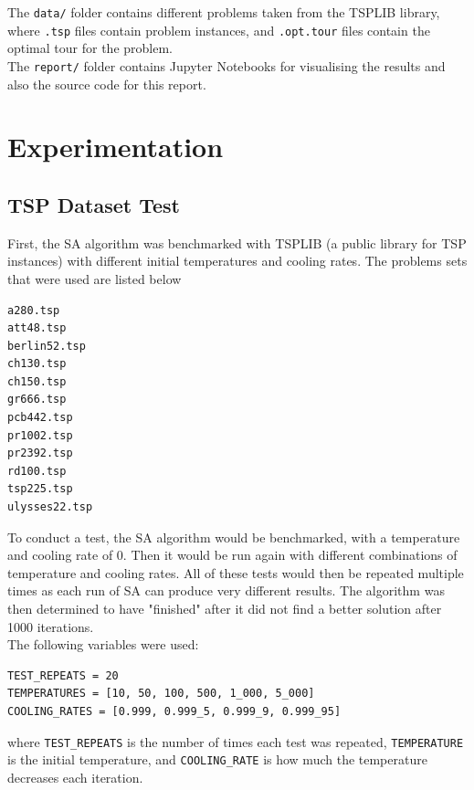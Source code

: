 \documentclass{article}
\begin{document}
The \texttt{data/} folder contains different problems taken from the TSPLIB library, where \texttt{.tsp} files contain problem instances, and \texttt{.opt.tour} files contain the optimal tour for the problem.
\\

The \texttt{report/} folder contains Jupyter Notebooks for visualising the results and also the source code for this report.

\newpage
\section{Experimentation}

\subsection{TSP Dataset Test}
First, the SA algorithm was benchmarked with TSPLIB \cite{tsplib} (a public library for TSP instances) with different initial temperatures and cooling rates.
The problems sets that were used are listed below

\begin{multicols}{6}
\begin{verbatim}
a280.tsp
att48.tsp
berlin52.tsp
ch130.tsp
ch150.tsp
gr666.tsp
pcb442.tsp
pr1002.tsp
pr2392.tsp
rd100.tsp
tsp225.tsp
ulysses22.tsp
\end{verbatim}
\end{multicols}

To conduct a test, the SA algorithm would be benchmarked, with a temperature and cooling rate of 0.
Then it would be run again with different combinations of temperature and cooling rates.
All of these tests would then be repeated multiple times as each run of SA can produce very different results.
The algorithm was then determined to have "finished" after it did not find a better solution after 1000 iterations.
\\

The following variables were used:

\begin{verbatim}
TEST_REPEATS = 20
TEMPERATURES = [10, 50, 100, 500, 1_000, 5_000]
COOLING_RATES = [0.999, 0.999_5, 0.999_9, 0.999_95]
\end{verbatim}

where \texttt{TEST\_REPEATS} is the number of times each test was repeated, \texttt{TEMPERATURE} is the initial temperature, and \texttt{COOLING\_RATE} is how much the temperature decreases each iteration.
\end{document}
